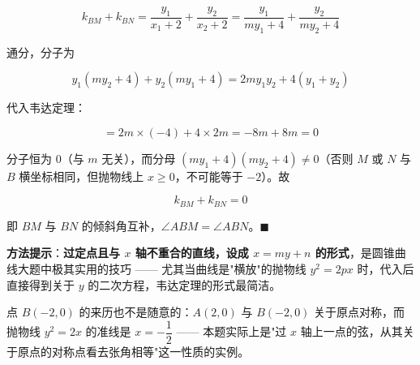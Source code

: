 \begin{answer}
\nopagebreak[4]
\[k_{BM}+k_{BN}=\frac{y_1}{x_1+2}+\frac{y_2}{x_2+2}=\frac{y_1}{my_1+4}+\frac{y_2}{my_2+4}\]

通分，分子为

\nopagebreak[4]
\[y_1\left(my_2+4\right)+y_2\left(my_1+4\right)=2my_1y_2+4\left(y_1+y_2\right)\]

代入韦达定理：

\nopagebreak[4]
\[=2m\times(-4)+4\times2m=-8m+8m=0\]

分子恒为 $0$（与 $m$ 无关），而分母 $\left(my_1+4\right)\left(my_2+4\right)\ne0$（否则 $M$ 或 $N$ 与 $B$ 横坐标相同，但抛物线上 $x\ge0$，不可能等于 $-2$）。故

\nopagebreak[4]
\[k_{BM}+k_{BN}=0\]

即 $BM$ 与 $BN$ 的倾斜角互补，$\angle ABM=\angle ABN$。$\blacksquare$

\begin{gktip}
\textbf{方法提示}：\textbf{过定点且与 $x$ 轴不重合的直线，设成 $x=my+n$ 的形式}，是圆锥曲线大题中极其实用的技巧 —— 尤其当曲线是"横放"的抛物线 $y^{2}=2px$ 时，代入后直接得到关于 $y$ 的二次方程，韦达定理的形式最简洁。

点 $B(-2,0)$ 的来历也不是随意的：$A(2,0)$ 与 $B(-2,0)$ 关于原点对称，而抛物线 $y^{2}=2x$ 的准线是 $x=-\dfrac12$ —— 本题实际上是"过 $x$ 轴上一点的弦，从其关于原点的对称点看去张角相等"这一性质的实例。
\end{gktip}



\par\medskip

\end{answer}
